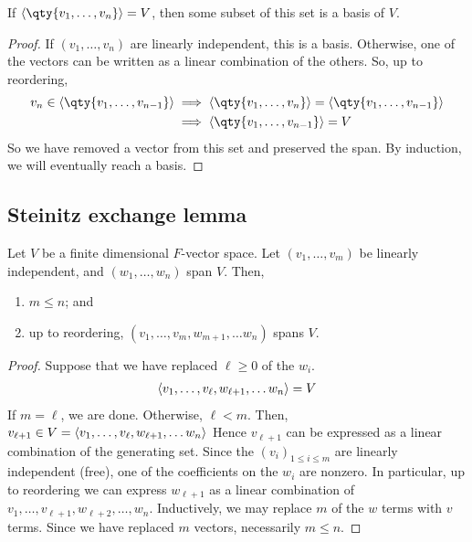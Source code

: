     \begin{lemma}
        If $\genset{\qty{v_1, \dots, v_n}} = V$, then some subset of this set is a basis of $V$.
    \end{lemma}
    \begin{proof}
        If $(v_1, \dots, v_n)$ are linearly independent, this is a basis.
        Otherwise, one of the vectors can be written as a linear combination of the others.
        So, up to reordering,
        \begin{align*}
            v_n \in \genset{\qty{v_1, \dots, v_{n-1}}} &\implies \genset{\qty{v_1, \dots, v_n}} = \genset{\qty{v_1, \dots, v_{n-1}}} \\
            &\implies \genset{\qty{v_1, \dots, v_{n-1}}} = V
        \end{align*}
        So we have removed a vector from this set and preserved the span.
        By induction, we will eventually reach a basis.
    \end{proof}

    \subsection{Steinitz exchange lemma}
    \begin{theorem}
        Let $V$ be a finite dimensional $F$-vector space.
        Let $(v_1, \dots, v_m)$ be linearly independent, and $(w_1, \dots, w_n)$ span $V$.
        Then,
        \begin{enumerate}
            \item $m \leq n$; and
            \item up to reordering, $(v_1, \dots, v_m, w_{m+1}, \dots w_n)$ spans $V$.
        \end{enumerate}
    \end{theorem}
    \begin{proof}
        Suppose that we have replaced $\ell \geq 0$ of the $w_i$.
        \begin{align*}
            \langle{} v_1, \dots, v_\ell, w_{\ell+1}, \dots w_n \rangle = V
        \end{align*}
        If $m = \ell$, we are done.
        Otherwise, $\ell < m$.
        Then,
        $v_{\ell + 1} \in V = \langle{} v_1, \dots, v_\ell, w_{\ell+1}, \dots w_n \rangle$
        Hence $v_{\ell + 1}$ can be expressed as a linear combination of the generating set.
        Since the $(v_i)_{1 \leq i \leq m}$ are linearly independent (free), one of the coefficients on the $w_i$ are nonzero.
        In particular, up to reordering we can express $w_{\ell+1}$ as a linear combination of $v_1, \dots, v_{\ell + 1}, w_{\ell + 2}, \dots, w_n$.
        Inductively, we may replace $m$ of the $w$ terms with $v$ terms.
        Since we have replaced $m$ vectors, necessarily $m \leq n$.
    \end{proof}

